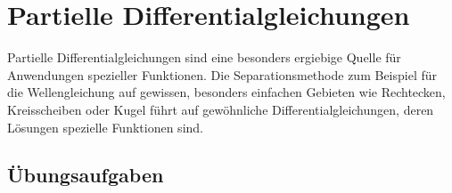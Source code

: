 %
%
%
\chapter{Partielle Differentialgleichungen
\label{buch:chapter:pde}}
\rhead{}
Partielle Differentialgleichungen sind eine besonders ergiebige
Quelle für Anwendungen spezieller Funktionen.
Die Separationsmethode zum Beispiel für die Wellengleichung
auf gewissen, besonders einfachen Gebieten wie Rechtecken,
Kreisscheiben oder Kugel führt auf gewöhnliche Differentialgleichungen,
deren Lösungen spezielle Funktionen sind.




%
%


\section*{Übungsaufgaben}
\begin{uebungsaufgaben}
\end{uebungsaufgaben}

